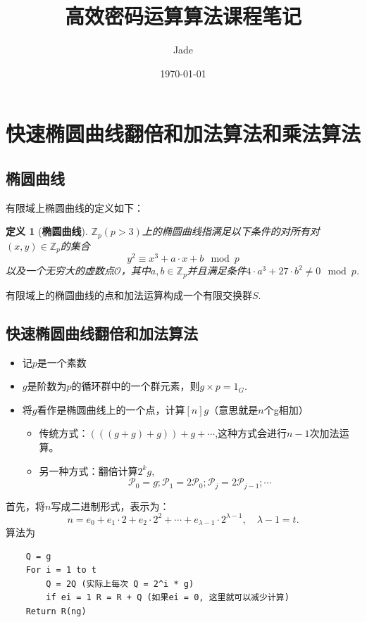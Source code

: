 \documentclass[10pt]{ctexart}
\title{高效密码运算算法课程笔记}
\author{Jade}
\date{\today}
\newtheorem{definition}{定义}
\begin{document}
\maketitle
\tableofcontents
\section{快速椭圆曲线翻倍和加法算法和乘法算法}
\subsection{椭圆曲线}
有限域上椭圆曲线的定义如下：
\begin{definition}[\textbf{椭圆曲线}]
    $\mathbb{Z}_p(p>3)$上的椭圆曲线指满足以下条件的对所有对$(x,y) \in \mathbb{Z}_p$的集合
    \begin{equation}
        y^2 \equiv x^3 + a \cdot x + b \mod p
    \end{equation}
    以及一个无穷大的虚数点$\mathcal{O}$，其中$a,b \in \mathbb{Z}_p$并且满足条件$4 \cdot a^3 + 27 \cdot b^2 \neq 0 \mod p$.
\end{definition}
有限域上的椭圆曲线的点和加法运算构成一个有限交换群$S$.

\subsection{快速椭圆曲线翻倍和加法算法}
\begin{itemize}
    \item 记$p$是一个素数
    \item $g$是阶数为$p$的循环群中的一个群元素，则$g \times p = 1_G$.
    \item 将$g$看作是椭圆曲线上的一个点，计算$[n]g$（意思就是$n$个g相加）
    \begin{itemize}
        \item 传统方式：$(((g + g) + g)) + g + \cdots$,这种方式会进行$n-1$次加法运算。
        \item 另一种方式：翻倍计算$2^kg$,
        $$
        \mathcal{P}_0 = g; \mathcal{P}_1 = 2 \mathcal{P}_0; \mathcal{P}_j = 2 \mathcal{P}_{j-1}; \cdots
        $$
    \end{itemize} 
\end{itemize}
首先，将$n$写成二进制形式，表示为：
\begin{displaymath}
    n = e_0 + e_1 \cdot 2 + e_2 \cdot 2^2 + \cdots + e_{\lambda - 1} \cdot 2 ^{\lambda - 1}, \quad \lambda - 1 = t.
\end{displaymath}
算法为
\begin{lstlisting}
    Q = g
    For i = 1 to t
        Q = 2Q (实际上每次 Q = 2^i * g)
        if ei = 1 R = R + Q (如果ei = 0, 这里就可以减少计算)
    Return R(ng)
\end{lstlisting}
\end{document}
